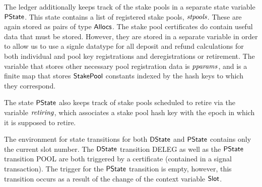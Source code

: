 The ledger additionally keeps track of the stake pools in a separate state variable
$\mathsf{PState}$.
This state contains a list of registered stake pools, $\mathit{stpools}$.
These are again stored as pairs of type $\mathsf{Allocs}$. The stake pool certificates
do contain useful data that must be stored. However, they are stored in a
separate variable in order to allow us to use a signle datatype for
all deposit and refund calculations for both individual and pool key registrations
and deregistrations or retirement. The variable that stores other necessary pool
registration data is $\mathit{pparams}$, and is a finite map that stores $\mathsf{StakePool}$
constants indexed
by the hash keys to which they correspond.

The state $\mathsf{PState}$ also keeps track of
stake pools scheduled to retire via the variable $\mathit{retiring}$,
which associates
a stake pool hash key with the epoch in which it is supposed to retire.

The environment for state transitions for both $\mathsf{DState}$ and $\mathsf{PState}$ contains
only the current slot number. The $\mathsf{DState}$ transition DELEG as well as
the $\mathsf{PState}$ transition POOL are both triggered by a
certificate (contained in a signal transaction). The trigger for the
$\mathsf{PState}$ transition is empty, however, this transition occurs as a result
of the change of the context variable $\mathsf{Slot}$.


